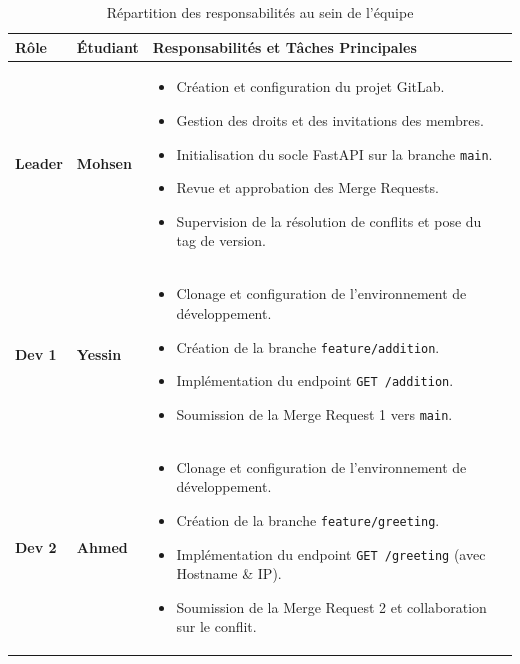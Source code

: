 \documentclass[a4paper,12pt]{article}
\begin{document}
\begin{table}[h!]
\centering
\begin{tabular}{|l|l|p{8.5cm}|}
\hline
\textbf{Rôle} & \textbf{Étudiant} & \textbf{Responsabilités et Tâches Principales} \\
\hline
\textbf{Leader} & \textbf{Mohsen} & 
\begin{itemize}
    \item Création et configuration du projet GitLab.
    \item Gestion des droits et des invitations des membres.
    \item Initialisation du socle FastAPI sur la branche \texttt{main}.
    \item Revue et approbation des Merge Requests.
    \item Supervision de la résolution de conflits et pose du tag de version.
\end{itemize} \\
\hline
\textbf{Dev 1} & \textbf{Yessin} & 
\begin{itemize}
    \item Clonage et configuration de l'environnement de développement.
    \item Création de la branche \texttt{feature/addition}.
    \item Implémentation du endpoint \texttt{GET /addition}.
    \item Soumission de la Merge Request 1 vers \texttt{main}.
\end{itemize} \\
\hline
\textbf{Dev 2} & \textbf{Ahmed} & 
\begin{itemize}
    \item Clonage et configuration de l'environnement de développement.
    \item Création de la branche \texttt{feature/greeting}.
    \item Implémentation du endpoint \texttt{GET /greeting} (avec Hostname \& IP).
    \item Soumission de la Merge Request 2 et collaboration sur le conflit.
\end{itemize} \\
\hline
\end{tabular}
\caption{Répartition des responsabilités au sein de l'équipe}
\end{table}

\end{document}
